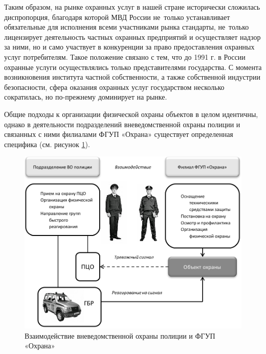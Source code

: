 \documentclass[a4paper,12pt,fleqn]{article} %
\begin{document}
Таким образом, на рынке охранных услуг в нашей стране исторически сложилась диспропорция, благодаря которой МВД России не~только устанавливает обязательные для исполнения всеми участниками рынка стандарты, не~только лицензирует деятельность частных охранных предприятий и осуществляет надзор за ними, но и само участвует в конкуренции за право предоставления охранных услуг потребителям. Такое положение связано с тем, что до 1991 г. в России охранные услуги осуществлялись только представителями государства. С момента возникновения института частной собственности, а также собственной индустрии безопасности, сфера оказания охранных услуг государством несколько сократилась, но по-прежнему доминирует на рынке.

Общие подходы к организации физической охраны объектов в целом идентичны, однако в деятельности подразделений вневедомственной охраны полиции и связанных с ними филиалами ФГУП «Охрана» существует определенная специфика (см. рисунок \ref{image7}).

\begin{figure}[h]
	\centering
	\includegraphics[scale=0.7]{img7}
	\caption{Взаимодействие вневедомственной охраны полиции и ФГУП «Охрана»}
	\label{image7}
\end{figure}
\end{document}
